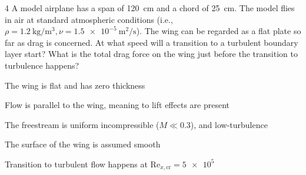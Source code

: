 \begin{problem}{4}
  A model airplane has a span of \qty{120}{\cm}  and a chord of \qty{25}{\cm}.
  The model flies in air at standard atmospheric conditions (i.e., $\rho = \qty{1,2}{\kg\per\m^3}, \nu = \qty{1,5e-5}{\m^2\per\s} $).
  The wing can be regarded as a flat plate so far as drag is concerned.
  At what speed will a transition to a turbulent boundary layer start?
  What is the total drag force on the wing just before the transition to turbulence happens?
\end{problem}

\begin{assumptions}
  \item The wing is flat and has zero thickness
  \item Flow is parallel to the wing, meaning to lift effects are present
  \item The freestream is uniform incompressible ($M \ll \num{0,3}$), and low-turbulence
  \item The surface of the wing is assumed smooth
  \item Transition to turbulent flow happens at $\mathrm{Re}_{x, \mathrm{cr}} = \num{5e5}$
\end{assumptions}

